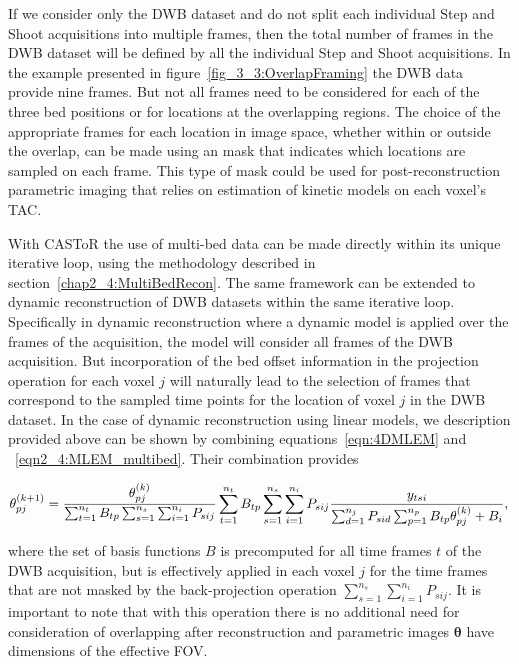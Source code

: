 If we consider only the DWB dataset and do not split each individual Step and Shoot acquisitions into multiple frames, then the total number of frames in the DWB dataset will be defined by all the individual Step and Shoot acquisitions. In the example presented in figure~\ref{fig_3_3:OverlapFraming} the DWB data provide nine frames. 
But not all frames need to be considered for each of the three bed positions or for locations at the overlapping regions. 
The choice of the appropriate frames for each location in image space, whether within or outside the overlap, can be made using an mask that indicates which locations are sampled on each frame. 
This type of mask could be used for post-reconstruction parametric imaging that relies on estimation of kinetic models on each voxel's TAC. 

With CASToR the use of multi-bed data can be made directly within its unique iterative loop, using the methodology described in section~\ref{chap2_4:MultiBedRecon}. The same framework can be extended to dynamic reconstruction of DWB datasets within the same iterative loop. Specifically in dynamic reconstruction where a dynamic model is applied over the frames of the acquisition, the model will consider all frames of the DWB acquisition. But incorporation of the bed offset information in the projection operation for each voxel $j$ will naturally lead to the selection of frames that correspond to the sampled time points for the location of voxel $j$ in the DWB dataset.
In the case of dynamic reconstruction using linear models, we description provided above can be shown by combining equations~\ref{eqn:4DMLEM} and ~\ref{eqn2_4:MLEM_multibed}. Their combination provides

\begin{equation}
\theta_{pj}^{(k+1)} = \frac{\theta_{pj}^{(k)}}
{\sum_{t=1}^{n_t} B_{tp} \sum_{s=1}^{n_s} \sum_{i=1}^{n_i} P_{sij}} 
\sum_{t=1}^{n_t} B_{tp} \sum_{s=1}^{n_s} \sum_{i=1}^{n_i} P_{sij} 
\frac{y_{tsi}}
{\sum_{d=1}^{n_j} P_{sid} \sum_{p=1}^{n_p} B_{tp}\theta_{pj}^{(k)} + B_i } \\, \\
\label{eqn:4DMLEM_Multibed}
\end{equation} 

where the set of basis functions $B$ is precomputed for all time frames $t$ of the DWB acquisition, but is effectively applied in each voxel $j$ for the time frames that are not masked by the back-projection operation $\sum_{s=1}^{n_s} \sum_{i=1}^{n_i} P_{sij}$. It is important to note that with this operation there is no additional need for consideration of overlapping after reconstruction and parametric images $\boldsymbol\theta$ have dimensions of the effective FOV. 

